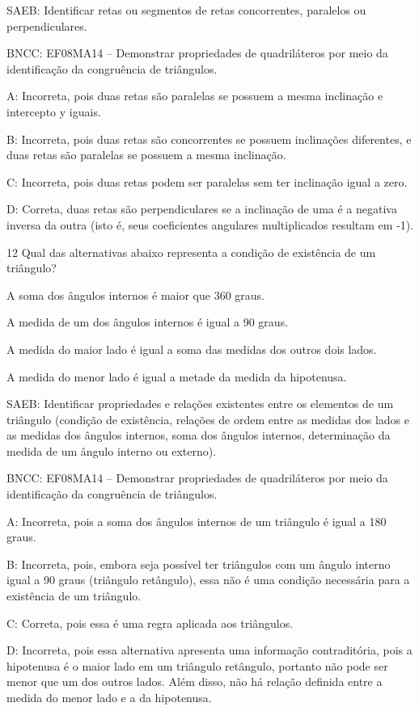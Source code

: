 {SAEB: Identificar retas ou segmentos de retas concorrentes, paralelos ou
perpendiculares.

BNCC: EF08MA14 -- Demonstrar propriedades de quadriláteros por meio da
identificação da congruência de triângulos.

A: Incorreta, pois duas retas são paralelas se possuem a mesma
inclinação e intercepto y iguais.

B: Incorreta, pois duas retas são concorrentes se possuem inclinações
diferentes, e duas retas são paralelas se possuem a mesma inclinação.

C: Incorreta, pois duas retas podem ser paralelas sem ter inclinação
igual a zero.

D: Correta, duas retas são perpendiculares se a inclinação de uma é a
negativa inversa da outra (isto é, seus coeficientes angulares
multiplicados resultam em -1).

\num{12} Qual das alternativas abaixo representa a condição de existência de
um triângulo?
\item A soma dos ângulos internos é maior que 360 graus.
\item A medida de um dos ângulos internos é igual a 90 graus.
\item A medida do maior lado é igual a soma das medidas dos outros dois
lados.
\item A medida do menor lado é igual a metade da medida da hipotenusa.

SAEB: Identificar propriedades e relações existentes entre os elementos
de um triângulo (condição de existência, relações de ordem entre as
medidas dos lados e as medidas dos ângulos internos, soma dos ângulos
internos, determinação da medida de um ângulo interno ou externo).

BNCC: EF08MA14 -- Demonstrar propriedades de quadriláteros por meio da
identificação da congruência de triângulos.

A: Incorreta, pois a soma dos ângulos internos de um triângulo é igual a
180 graus.

B: Incorreta, pois, embora seja possível ter triângulos com um ângulo
interno igual a 90 graus (triângulo retângulo), essa não é uma condição
necessária para a existência de um triângulo.

C: Correta, pois essa é uma regra aplicada aos triângulos.

D: Incorreta, pois essa alternativa apresenta uma informação
contraditória, pois a hipotenusa é o maior lado em um triângulo
retângulo, portanto não pode ser menor que um dos outros lados. Além
disso, não há relação definida entre a medida do menor lado e a da
hipotenusa.

}
